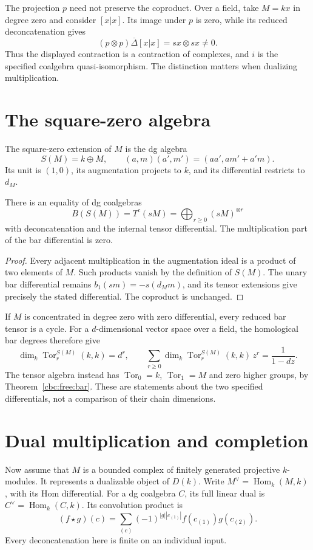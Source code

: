 The projection $p$ need not preserve the coproduct.
Over a field, take $M=kx$ in degree zero and consider $[x|x]$.
Its image under $p$ is zero, while its reduced deconcatenation gives
\[
 (p\otimes p)\overline\Delta[x|x]=sx\otimes sx\ne0.
\]
Thus the displayed contraction is a contraction of complexes, and $i$ is the specified coalgebra quasi-isomorphism.
The distinction matters when dualizing multiplication.

\section{The square-zero algebra}

The square-zero extension of $M$ is the dg algebra
\[
 S(M)=k\oplus M,\qquad
 (a,m)(a',m')=(aa',am'+a'm).
\]
Its unit is $(1,0)$, its augmentation projects to $k$, and its differential restricts to $d_M$.

\begin{proposition}\label{cbc:free:square-zero}
There is an equality of dg coalgebras
\[
 B(S(M))=T^c(sM)=\bigoplus_{r\ge0}(sM)^{\otimes r}
\]
with deconcatenation and the internal tensor differential.
The multiplication part of the bar differential is zero.
\end{proposition}
\begin{proof}
Every adjacent multiplication in the augmentation ideal is a product of two elements of $M$.
Such products vanish by the definition of $S(M)$.
The unary bar differential remains $b_1(sm)=-s(d_Mm)$, and its tensor extensions give precisely the stated differential.
The coproduct is unchanged.
\end{proof}

If $M$ is concentrated in degree zero with zero differential, every reduced bar tensor is a cycle.
For a $d$-dimensional vector space over a field, the homological bar degrees therefore give
\[
 \dim_k\operatorname{Tor}^{S(M)}_r(k,k)=d^r,
 \qquad
 \sum_{r\ge0}\dim_k\operatorname{Tor}^{S(M)}_r(k,k)\,z^r
 =\frac1{1-dz}.
\]
The tensor algebra instead has $\operatorname{Tor}_0=k$, $\operatorname{Tor}_1=M$ and zero higher groups, by Theorem~\ref{cbc:free:bar}.
These are statements about the two specified differentials, not a comparison of their chain dimensions.

\section{Dual multiplication and completion}

Now assume that $M$ is a bounded complex of finitely generated projective $k$-modules.
It represents a dualizable object of $D(k)$.
Write $M^\vee=\operatorname{Hom}_k(M,k)$, with its Hom differential.
For a dg coalgebra $C$, its full linear dual is $C^\vee=\operatorname{Hom}_k(C,k)$.
Its convolution product is
\[
 (f\star g)(c)=\sum_{(c)}(-1)^{|g||c_{(1)}|}
                    f(c_{(1)})g(c_{(2)}).
\]
Every deconcatenation here is finite on an individual input.

